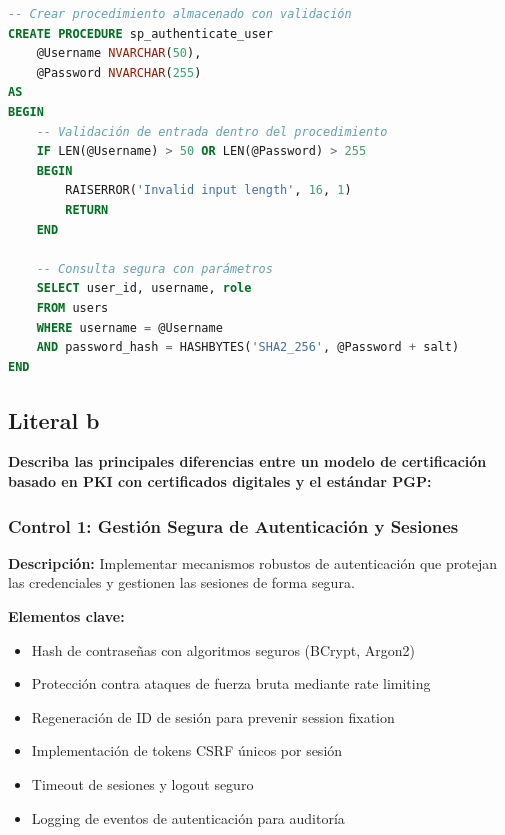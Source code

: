 {\begin{lstlisting}[language=SQL, caption=Procedimiento almacenado seguro]
-- Crear procedimiento almacenado con validación
CREATE PROCEDURE sp_authenticate_user
    @Username NVARCHAR(50),
    @Password NVARCHAR(255)
AS
BEGIN
    -- Validación de entrada dentro del procedimiento
    IF LEN(@Username) > 50 OR LEN(@Password) > 255
    BEGIN
        RAISERROR('Invalid input length', 16, 1)
        RETURN
    END
    
    -- Consulta segura con parámetros
    SELECT user_id, username, role 
    FROM users 
    WHERE username = @Username 
    AND password_hash = HASHBYTES('SHA2_256', @Password + salt)
END
\end{lstlisting}



\subsection{Literal b}
\textbf{Describa las principales diferencias entre un modelo de certificación basado en PKI
con certificados digitales y el estándar PGP:}


\subsubsection{Control 1: Gestión Segura de Autenticación y Sesiones}

\textbf{Descripción:} Implementar mecanismos robustos de autenticación que protejan las credenciales y gestionen las sesiones de forma segura.

\textbf{Elementos clave:}
\begin{itemize}
    \item Hash de contraseñas con algoritmos seguros (BCrypt, Argon2)
    \item Protección contra ataques de fuerza bruta mediante rate limiting
    \item Regeneración de ID de sesión para prevenir session fixation
    \item Implementación de tokens CSRF únicos por sesión
    \item Timeout de sesiones y logout seguro
    \item Logging de eventos de autenticación para auditoría
\end{itemize}

}
